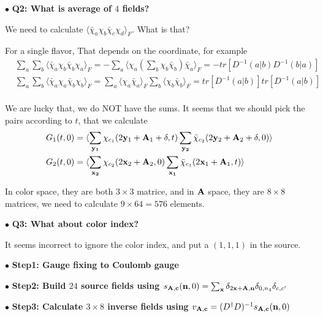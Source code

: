 $\bullet$ \textbf{Q2: What is average of $4$ fields?}

We need to calculate $\langle \bar{\chi}_a\chi _b \bar{\chi} _c\chi _d\rangle _F$. What is that?

For a single flavor, That depends on the coordinate, for example
\begin{equation}
\begin{split}
&\sum _a \sum _b\langle \bar{\chi}_a\chi _b \bar{\chi} _b\chi _a\rangle _F = -\sum _a  \langle \chi _a \left(\sum _b \chi _b \bar{\chi} _b\right) \bar{\chi}_a\rangle _F=-tr[D^{-1}(a|b)D^{-1}(b|a)]\\
&\sum _a \sum _b\langle \bar{\chi}_a\chi _a \bar{\chi} _b\chi _b\rangle _F = \sum _a  \langle \chi _a \bar{\chi}_a\rangle _F \sum _b  \langle \chi _b \bar{\chi}_b\rangle _F=tr[D^{-1}(a|b)]tr[D^{-1}(a|b)]\\
\end{split}
\end{equation}

We are lucky that, we do NOT have the sums. It seems that we should pick the pairs according to $t$, that we calculate
\begin{equation}
\begin{split}
&G_1(t,0)=\langle \sum _{\bf y _1}\chi _{c_1} (2{\bf y}_1+{\bf A}_1+\delta,t)  \sum _{\bf y_2}\bar{\chi} _{c_2} (2{\bf y}_2+{\bf A}_2+\delta,0) \rangle\\
&G_2(t,0)=\langle \sum _{\bf x _2} \chi_{c_2}(2{\bf x}_2+{\bf A}_2,0) \sum _{\bf x _1}\bar{\chi}_{c_1}(2{\bf x}_1+{\bf A}_1,t) \rangle\\
\end{split}
\end{equation}

In color space, they are both $3\times 3$ matrice, and in ${\bf A}$ space, they are $8\times 8$ matrices, we need to calculate $9\times 64=576$ elements.

$\bullet$ \textbf{Q3: What about color index?}

It seems incorrect to ignore the color index, and put a $(1,1,1)$ in the source.

$\bullet$ \textbf{Step1: Gauge fixing to Coulomb gauge}

$\bullet$ \textbf{Step2: Build $24$ source fields using $s_{\bf A, c}({\bf n}, 0) = \sum _{{\bf x}} \delta _{2{\bf x}+{\bf A},{\bf n}}\delta _{0,n_4}\delta_{c,c'}$}

$\bullet$ \textbf{Step3: Calculate $3\times 8$ inverse fields using $v _{\bf A, c}=(D^{\dagger}D)^{-1}s_{\bf A, c}({\bf n}, 0)$}

